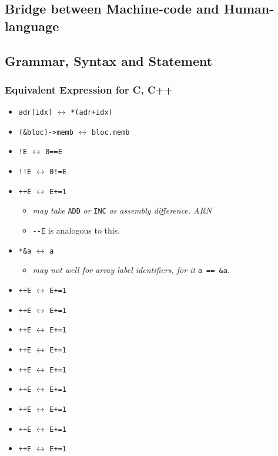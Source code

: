 
\subsection{Bridge between Machine-code and Human-language}


\subsection{Grammar, Syntax and Statement}

\subsubsection{Equivalent Expression for C, C++}

\begin{itemize}
	\item{\verb|adr[idx]| $\leftrightarrow$ \verb|*(adr+idx)|}
	\item{\verb|(&bloc)->memb| $\leftrightarrow$ \verb|bloc.memb|}
	\item{\verb|!E| $\leftrightarrow$ \verb|0==E|}
	\item{\verb|!!E| $\leftrightarrow$ \verb|0!=E|}
	\item{\verb|++E| $\leftrightarrow$ \verb|E+=1|
		\begin{itemize}
			\item\textit{may take} \verb|ADD| \textit{or} \verb|INC| \textit{as assembly difference. \textemdash ARN}
			\item\verb|--E| is analogous to this.
		\end{itemize}
	}
	\item{\verb|*&a| $\leftrightarrow$ \verb|a|
		\begin{itemize}
			\item\textit{may not well for array label identifiers, for it} \verb|a == &a|.
		\end{itemize}
	}
	\item{\verb|++E| $\leftrightarrow$ \verb|E+=1|}
	\item{\verb|++E| $\leftrightarrow$ \verb|E+=1|}
	\item{\verb|++E| $\leftrightarrow$ \verb|E+=1|}
	\item{\verb|++E| $\leftrightarrow$ \verb|E+=1|}
	\item{\verb|++E| $\leftrightarrow$ \verb|E+=1|}
	\item{\verb|++E| $\leftrightarrow$ \verb|E+=1|}
	\item{\verb|++E| $\leftrightarrow$ \verb|E+=1|}
	\item{\verb|++E| $\leftrightarrow$ \verb|E+=1|}
	\item{\verb|++E| $\leftrightarrow$ \verb|E+=1|}
\end{itemize}


